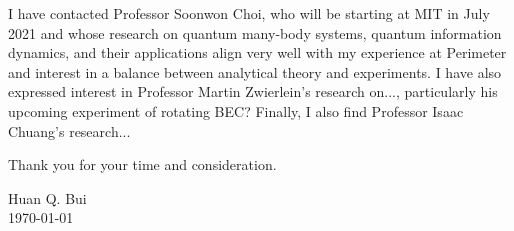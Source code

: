 \documentclass[12pt]{article}
\begin{document}
I have contacted Professor Soonwon Choi, who will be starting at MIT in July 2021 and whose research on quantum many-body systems, quantum information dynamics, and their applications align very well with my experience at Perimeter and interest in a balance between analytical theory and experiments. I have also expressed interest in Professor Martin Zwierlein's research on..., particularly his upcoming experiment of rotating BEC? Finally, I also find Professor Isaac Chuang's research...  \\ \vspace{-9pt}

\noindent Thank you for your time and consideration.\\ \vspace{-9pt}

\noindent Huan Q. Bui\\
\today


\newpage
\begin{spacing}{0}
	
	 
\end{spacing}

	

















	
	
	
	
	
\end{document}
